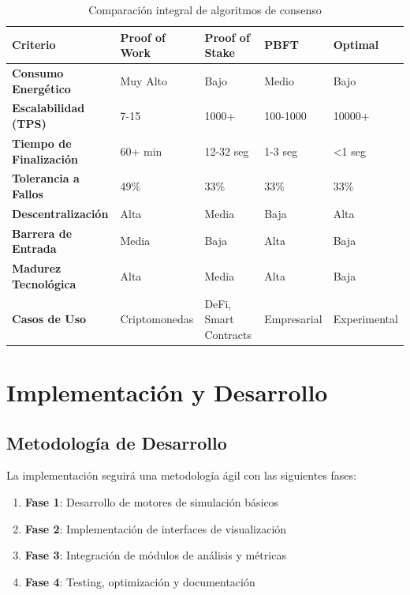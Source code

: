 \documentclass[spanish,12pt,letterpaper]{report}
\begin{document}
\begin{table}[h]
\centering
\scriptsize
\begin{tabular}{|p{2.5cm}|p{3cm}|p{3cm}|p{3cm}|p{2cm}|}
\hline
\textbf{Criterio} & \textbf{Proof of Work} & \textbf{Proof of Stake} & \textbf{PBFT} & \textbf{Optimal} \\
\hline
\textbf{Consumo Energético} & Muy Alto & Bajo & Medio & Bajo \\
\hline
\textbf{Escalabilidad (TPS)} & 7-15 & 1000+ & 100-1000 & 10000+ \\
\hline
\textbf{Tiempo de Finalización} & 60+ min & 12-32 seg & 1-3 seg & <1 seg \\
\hline
\textbf{Tolerancia a Fallos} & 49\% & 33\% & 33\% & 33\% \\
\hline
\textbf{Descentralización} & Alta & Media & Baja & Alta \\
\hline
\textbf{Barrera de Entrada} & Media & Baja & Alta & Baja \\
\hline
\textbf{Madurez Tecnológica} & Alta & Media & Alta & Baja \\
\hline
\textbf{Casos de Uso} & Criptomonedas & DeFi, Smart Contracts & Empresarial & Experimental \\
\hline
\end{tabular}
\caption{Comparación integral de algoritmos de consenso}
\label{tab:consensus-comparison}
\end{table}

\section{Implementación y Desarrollo}

\subsection{Metodología de Desarrollo}

La implementación seguirá una metodología ágil con las siguientes fases:

\begin{enumerate}
    \item \textbf{Fase 1}: Desarrollo de motores de simulación básicos
    \item \textbf{Fase 2}: Implementación de interfaces de visualización
    \item \textbf{Fase 3}: Integración de módulos de análisis y métricas
    \item \textbf{Fase 4}: Testing, optimización y documentación
\end{enumerate}
\end{document}
